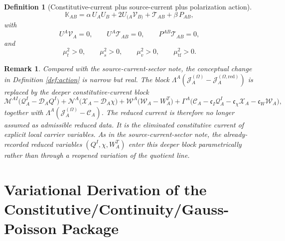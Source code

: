 \documentclass[11pt]{article}
\newcommand{\ProjSub}{P}
\newcommand{\SpatialD}{\mathcal D}
\newcommand{\SourceCurrent}{\mathcal J^{(\Omega)}}
\newcommand{\SourceCurrentRed}{\mathcal J^{(\Omega,\mathrm{red})}}
\newcommand{\ConstCurrent}{\mathcal C}
\newcommand{\QCarrier}{\mathcal Q}
\newcommand{\ChiCarrier}{\mathcal X}
\newcommand{\TransCarrier}{\mathcal W}
\newcommand{\CurrentMult}{\Lambda}
\newcommand{\ConstGamma}{\Gamma}
\newcommand{\QMult}{\mathscr M}
\newcommand{\ChiMult}{\mathscr N}
\newcommand{\TransMult}{\mathscr W}
\newcommand{\AuxPol}{\mathbb K}
\newtheorem{definition}{Definition}
\newtheorem{remark}{Remark}
\begin{document}
\begin{definition}[Constitutive-current plus source-current plus polarization action]
\begin{equation}
\AuxPol_{AB}
=
\alpha\,U_AU_B
+2U_{(A}\mathcal V_{B)}
+\mathcal T_{AB}
+\beta\,\ProjSub_{AB},
\label{eq:Kdecomp}
\end{equation}
with
\begin{equation}
U^A\mathcal V_A=0,
\qquad
U^A\mathcal T_{AB}=0,
\qquad
\ProjSub^{AB}\mathcal T_{AB}=0,
\label{eq:TVcond}
\end{equation}
and
\begin{equation}
\mu_t^2>0,
\qquad
\mu_s^2>0,
\qquad
\mu_v^2>0,
\qquad
\mu_{\mathrm{tf}}^2>0.
\label{eq:masses}
\end{equation}
\end{definition}

\begin{remark}
Compared with the source-current-sector note, the conceptual change in Definition \ref{def:action} is narrow but real. The block \(\CurrentMult^A(\SourceCurrent_A-\SourceCurrentRed_A)\) is replaced by the deeper constitutive-current block
\[
\QMult^{AI}\bigl(\QCarrier^I_A-\SpatialD_AQ^I\bigr)
+\ChiMult^A\bigl(\ChiCarrier_A-\SpatialD_A\chi\bigr)
+\TransMult^A\bigl(\TransCarrier_A-W_A^T\bigr)
+\ConstGamma^A\bigl(\ConstCurrent_A-\mathfrak c_I\QCarrier^I_A-\mathfrak c_\chi\ChiCarrier_A-\mathfrak c_W\TransCarrier_A\bigr),
\]
together with \(\CurrentMult^A(\SourceCurrent_A-\ConstCurrent_A)\). The reduced current is therefore no longer assumed as admissible reduced data. It is the eliminated constitutive current of explicit local carrier variables. As in the source-current-sector note, the already-recorded reduced variables \((Q^I,\chi,W_A^T)\) enter this deeper block parametrically rather than through a reopened variation of the quotient line.
\end{remark}

\section{Variational Derivation of the Constitutive/Continuity/Gauss-Poisson Package}
\end{document}
